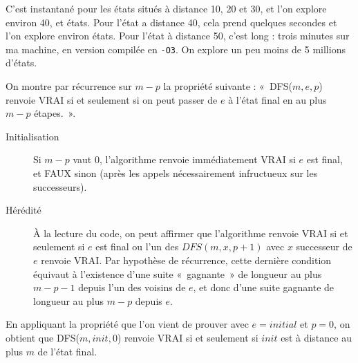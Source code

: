 \begin{ques}
  C'est instantané pour les états situés à distance 10, 20 et 30,
  et l'on explore environ 40,  et  états.
  Pour l'état a distance 40, cela prend quelques secondes
  et l'on explore environ  états. Pour l'état
  à distance 50, c'est long : trois minutes sur ma machine, en
  version compilée en \verb!-O3!. On explore un peu moins
  de 5 millions d'états.
\end{ques}

\begin{ques}
  On montre par récurrence sur $m - p$ la propriété suivante :
  «~DFS($m, e, p$) renvoie VRAI si et seulement si on peut passer de $e$
  à l'état final en au plus $m - p$ étapes.~».
  \begin{description}
    \item[Initialisation] Si $m - p$ vaut 0, l'algorithme renvoie
    immédiatement VRAI si $e$ est final, et FAUX sinon (après les appels
    nécessairement infructueux sur les successeurs).
    \item[Hérédité] À la lecture du code, on peut affirmer que
    l'algorithme renvoie VRAI si et seulement si $e$ est final ou
    l'un des $DFS(m, x, p + 1)$ avec $x$ successeur de $e$ renvoie VRAI.
    Par hypothèse de récurrence,
    cette dernière condition équivaut à l'existence d'une suite «~gagnante~»
    de longueur au plus $m - p - 1$ depuis l'un des voisins de $e$, et donc
    d'une suite gagnante de longueur au plus $m - p$ depuis $e$.
  \end{description}
  En appliquant la propriété que l'on vient de prouver avec $e = initial$ et
  $p = 0$, on obtient que
  DFS($m, init, 0$) renvoie VRAI si et seulement
    si $init$ est à distance au plus $m$ de l'état final.
\end{ques}

